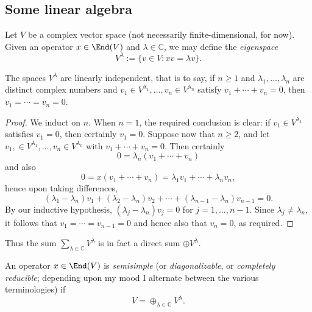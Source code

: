 \documentclass[reqno]{amsart} 
\begin{document}
\subsection{Some linear algebra\label{sec:some-lin-alg}}
\label{sec:orge7b7a5c}
Let $V$ be a complex vector space (not necessarily finite-dimensional, for now).  Given an operator $x \in \End(V)$ and $\lambda \in \mathbb{C}$, we may define the \emph{eigenspace}
\begin{equation*}
  V^\lambda := \{v \in V : x v = \lambda v\}.
\end{equation*}
\begin{lemma}\label{lem:lin-indep-eigenspaces}
  The spaces $V^{\lambda}$ are linearly independent, that is to say, if $n \geq 1$ and $\lambda_1,\dotsc,\lambda_n$ are distinct complex numbers and $v_1 \in V^{\lambda_1}, \dotsc, v_n \in V^{\lambda_n}$ satisfy $v_1 + \dotsb + v_n = 0$, then $v_1 = \dotsb = v_n = 0$.
\end{lemma}
\begin{proof}
  We induct on $n$.  When $n = 1$, the required conclusion is clear: if $v_1 \in V^{\lambda_1}$ satisfies $v_1 = 0$, then certainly $v_1 = 0$.  Suppose now that $n \geq 2$, and let $v_1, \in V^{\lambda_1}, \dotsc,v_n \in V^{\lambda_n}$ with $v_1 + \dotsb + v_n = 0$.  Then certainly
  \begin{equation*}
    0 = \lambda_n(v_1 + \dotsb + v_n)
  \end{equation*}
  and also
  \begin{equation*}
    0 = x (v_1 + \dotsb + v_n) = \lambda_1 v_1 + \dotsb + \lambda_n v_n,
  \end{equation*}
  hence upon taking differences,
  \begin{equation*}
    (\lambda_1 - \lambda_n) v_1 + (\lambda_2 - \lambda_n) v_2 + \dotsb + (\lambda_{n-1} - \lambda_n) v_{n-1} = 0.
  \end{equation*}
  By our inductive hypothesis, $(\lambda_j - \lambda_n) v_j = 0$ for $j = 1,\dotsc,n-1$.  Since $\lambda_j \neq \lambda_n$, it follows that $v_1 = \dotsb = v_{n-1} = 0$ and hence also that $v_n = 0$, as required.
\end{proof}

Thus the sum $\sum_{\lambda \in \mathbb{C}} V^\lambda$ is in fact a direct sum $\oplus V^\lambda$.

\begin{definition}
  An operator $x \in \End(V)$ is \emph{semisimple} (or \emph{diagonalizable}, or \emph{completely reducible}; depending upon my mood I alternate between the various terminologies) if
  \begin{equation*}
    V = \oplus_{\lambda \in \mathbb{C}} V^\lambda.
  \end{equation*}
\end{definition}
\end{document}
